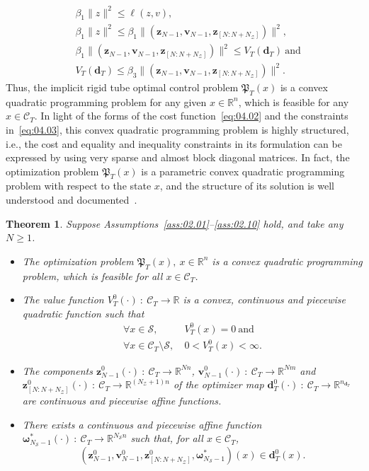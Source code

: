 \documentclass[twocolumn]{autart}
\newtheorem{theorem}{Theorem}
\newcommand{\mb}[1]{\mathbb{#1}}
\newcommand{\mc}[1]{\mathcal{#1}}
\newcommand{\mbf}[1]{\mathbf{#1}}
\newcommand{\bb}{\left(\cdot\right)}
\newcommand{\R}{\mb{R}}
\numberwithin{equation}{section}
\begin{document}
\begin{align*}
&\beta_1\|z\|^2\le \ell(z,v),\\
&\beta_1\|z\|^2\le \beta_1\|(\mbf{z}_{N-1},\mbf{v}_{N-1},\mbf{z}_{[N:N+N_\mc{Z}]})\|^2,\\
&\beta_1\|(\mbf{z}_{N-1},\mbf{v}_{N-1},\mbf{z}_{[N:N+N_\mc{Z}]})\|^2\le V_T(\mbf{d}_T)\ \text{and}\\
&V_T(\mbf{d}_T)\le \beta_3\|(\mbf{z}_{N-1},\mbf{v}_{N-1},\mbf{z}_{[N:N+N_\mc{Z}]})\|^2.
\end{align*}
Thus, the implicit rigid tube optimal control problem $\mathfrak{P}_T(x)$ is a convex quadratic programming problem for any given $x\in\R^n$, which is feasible for any $x\in\mc{C}_T$. In light of the forms of the cost function~\eqref{eq:04.02} and the constraints in~\eqref{eq:04.03}, this convex quadratic programming problem is highly structured, i.e., the cost and equality and inequality constraints in its formulation can be expressed by using very sparse and almost block diagonal matrices. In fact, the optimization problem $\mathfrak{P}_T(x)$ is a parametric convex quadratic programming problem with respect to the state $x$, and the structure of its solution is well understood and documented~\cite{rockafellar:wets:2009}. 
\begin{theorem}
\label{thm:04.01}
Suppose Assumptions~\ref{ass:02.01}--\ref{ass:02.10} hold, and take any $N\ge 1$. 
\begin{itemize}
\item [$(i)$] The optimization problem $\mathfrak{P}_T(x),\ x\in\R^n$ is a convex quadratic programming problem, which is feasible for all $x\in\mc{C}_T$.
\item [$(ii)$] The value function $V_T^0\bb \ :\ \mc{C}_T\rightarrow \R$ is a convex, continuous and piecewise quadratic function such that 
\begin{align*}
\forall x\in\mc{S},&\  V_T^0(x)=0\ \text{and}\\
\forall x\in\mc{C}_T\setminus \mc{S},&\  0<V_T^0(x)<\infty.
\end{align*}
\item [$(iii)$] The components $\mbf{z}_{N-1}^0\bb\ :\ \mc{C}_T\rightarrow \R^{Nn}$, $\mbf{v}_{N-1}^0\bb\ :\ \mc{C}_T\rightarrow \R^{Nm}$ and  $\mbf{z}_{[N:N+N_\mc{Z}]}^0\bb\ :\ \mc{C}_T\rightarrow \R^{(N_\mc{Z}+1)n}$ of the optimizer map $\mbf{d}_T^0\bb\ :\  \mc{C}_T\rightarrow \R^{n_{\mbf{d}_T}}$ are continuous and piecewise affine functions.
\item [$(iv)$] There exists a continuous and piecewise affine function $\boldsymbol{\omega}_{N_\mc{S}-1}^*\bb\ :\ \mc{C}_T\rightarrow \R^{N_\mc{S}n}$ such that, for all $x\in\mc{C}_T$,
\begin{equation*}
(\mbf{z}_{N-1}^0,\mbf{v}_{N-1}^0,\mbf{z}_{[N:N+N_\mc{Z}]}^0,\boldsymbol{\omega}_{N_\mc{S}-1}^*)(x)\in \mbf{d}_T^0(x).
\end{equation*}
\end{itemize}
\end{theorem}
\end{document}
